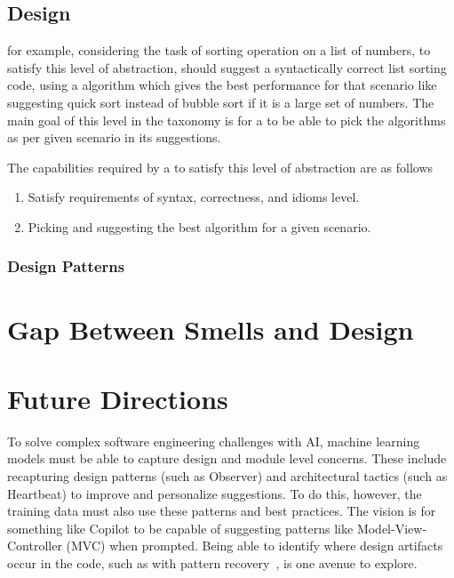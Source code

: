 \subsection{Design}
\label{design}

for example, considering the task of sorting operation on a list of numbers, to satisfy this level of abstraction, \cct should suggest a syntactically correct list sorting code, using a algorithm which gives the best performance for that scenario like suggesting quick sort instead of bubble sort if it is a large set of numbers. The main goal of this level in the taxonomy is for a \cct{} to be able to pick the algorithms as per given scenario in its suggestions.

The capabilities required by a \cct{} to satisfy this level of abstraction are as follows
\begin{enumerate}
    \item Satisfy requirements of syntax, correctness, and idioms level.
    \item Picking and suggesting the best algorithm for a given scenario.
\end{enumerate}

\subsubsection{Design Patterns}
\label{patterns}

\section{Gap Between Smells and Design}
\label{gap}

\section{Future Directions}
\label{future}
To solve complex software engineering challenges with AI, machine learning models must be able to capture design and module level concerns. 
These include recapturing design patterns (such as Observer) and architectural tactics (such as Heartbeat) to improve and personalize suggestions. 
To do this, however, the training data must also use these patterns and best practices.
The vision is for something like Copilot to be capable of suggesting patterns like Model-View-Controller (MVC) when prompted. 
Being able to identify where design artifacts occur in the code, such as with pattern recovery~\cite{Keim2020}, is one avenue to explore. 

